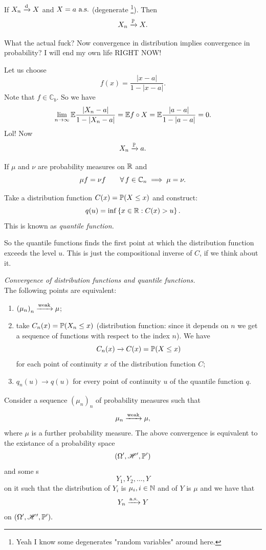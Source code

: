 \documentclass{report}
\begin{document}
\begin{remark}
	If $X_n\xrightarrow[]{\text{d}} X$ and $X=a\text{ a.s.}$ (degenerate \rv\footnote{Yeah I know some degenerates "random variables" around here.}). Then
	\[X_n\xrightarrow[]{\mathbb{P}} X.\]
\end{remark}
What the actual fuck? Now convergence in distribution implies convergence in probability? I will end my own life RIGHT NOW!
\begin{fancyproof}
	Let us choose
	\[f(x)=\frac{|x-a|}{1-|x-a|}.\]
	Note that $f\in\mathbb{C}_{b}$. So we have
	\[\lim_{n\to\infty}\mathbb{E}\frac{|X_n-a|}{1-|X_n-a|}=\mathbb{E} f\circ X=\mathbb{E}\frac{|a-a|}{1-|a-a|}=0.\]
	Lol! Now
	\[X_n\xrightarrow[]{\mathbb{P}} a.\]
\end{fancyproof}
\begin{proposition}
	If $\mu$ and $\nu$ are probability measures on $\mathbb{R}$ and 
	\[\mu f=\nu f\qquad\forall\, f\in\mathbb{C}_{n}\implies\mu=\nu.\]
\end{proposition}
\begin{definition}
	Take a distribution function $C(x)=\mathbb{P}(X\leq x)$ and construct:
	\[q(u)=\inf\left\{x\in\mathbb{R}:C(x)>u\right\}.\]
	This is known as \emph{quantile function.}
\end{definition}
So the quantile functions finds the first point at which the distribution function exceeds the level $u$. This is just the compositional inverse of $C$, if we think about it.
\begin{proposition}
	\emph{Convergence of distribution functions and quantile functions.}\\
	The following points are equivalent:
	\begin{enumerate}[\circnum]
		\item ${(\mu_n)}_{n}\xrightarrow[]{\mathrm{weak}}\mu$;
		\item take $C_n(x)=\mathbb{P}(X_n\leq x)$ (distribution function: since it depends on $n$ we get a sequence of functions with respect to the index $n$). We have 
		\[C_n(x)\xrightarrow[]{}C(x)=\mathbb{P}(X\leq x)\]
		for each point of continuity $x$ of the distribution function $C$;
		\item $q_n(u)\xrightarrow[]{}q(u)$ for every point of continuity $u$ of the quantile function $q$.
	\end{enumerate}
\end{proposition}
\begin{theorem}
	Consider a sequence ${(\mu_{n})}_{n}$ of probability measures such that 
	\[\mu_n\xrightarrow[]{\mathrm{weak}}\mu,\]
	where $\mu$ is a further probability measure. The above convergence is equivalent to the existance of a probability space
	\[(\Omega',\mathscr{H}',\mathbb{P}')\]
	and some \rv s
	\[Y_1,Y_2,\ldots,Y\]
	on it such that the distribution of $Y_i$ is $\mu_i,i\in\mathbb{N}$ and of $Y$ is $\mu$ and we have that
	\[Y_n\xrightarrow[]{\text{a.s.}} Y\]
	on $(\Omega',\mathscr{H}',\mathbb{P}').$
\end{theorem}
\end{document}
